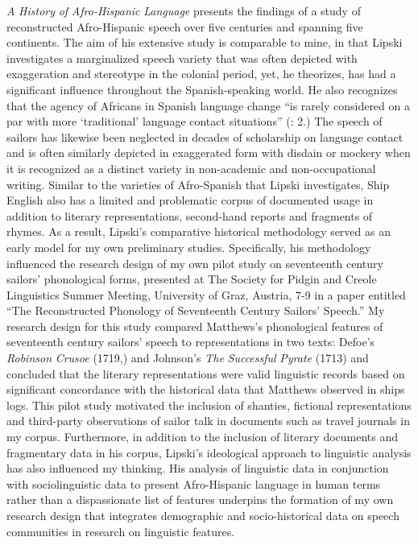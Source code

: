  \textit{A} \textit{History} \textit{of} \textit{Afro-Hispanic} \textit{Language} presents the findings of a study of reconstructed Afro-Hispanic speech over five centuries and spanning five continents. The aim of his extensive study is comparable to mine, in that Lipski investigates a marginalized speech variety that was often depicted with exaggeration and stereotype in the colonial period, yet, he theorizes, has had a significant influence throughout the Spanish-speaking world. He also recognizes that the agency of Africans in Spanish language change “is rarely considered on a par with more ‘traditional’ language contact situations” (\citealt{Lipski2005}: 2.) The speech of sailors has likewise been neglected in decades of scholarship on language contact and is often similarly depicted in exaggerated form with disdain or mockery when it is recognized as a distinct variety in non-academic and non-occupational writing. Similar to the varieties of Afro-Spanish that Lipski investigates, Ship English also has a limited and problematic corpus of documented usage in addition to literary representations, second-hand reports and fragments of rhymes. As a result, Lipski’s comparative historical methodology served as an early model for my own preliminary studies. Specifically, his methodology influenced the research design of my own pilot study on seventeenth century sailors’ phonological forms, presented at The Society for Pidgin and Creole Linguistics Summer Meeting, University of Graz, Austria, 7-9 \citealt{July2015} in a paper entitled “The Reconstructed Phonology of Seventeenth Century Sailors’ Speech.” My research design for this study compared Matthews’s phonological features of seventeenth century sailors’ speech to representations in two texts: Defoe’s \textit{Robinson} \textit{Crusoe} (1719,) and Johnson’s \textit{The} \textit{Successful} \textit{Pyrate} (1713) and concluded that the literary representations were valid linguistic records based on significant concordance with the historical data that Matthews observed in ships logs. This pilot study motivated the inclusion of shanties, fictional representations and third-party observations of sailor talk in documents such as travel journals in my corpus. Furthermore, in addition to the inclusion of literary documents and fragmentary data in his corpus, Lipski’s ideological approach to linguistic analysis has also influenced my thinking. His analysis of linguistic data in conjunction with sociolinguistic data to present Afro-Hispanic language in human terms rather than a dispassionate list of features underpins the formation of my own research design that integrates demographic and socio-historical data on speech communities in research on linguistic features.

